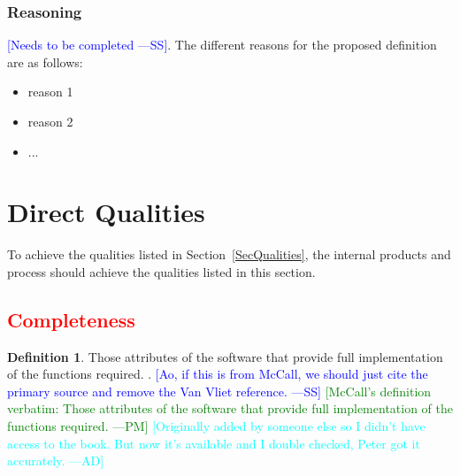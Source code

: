 \documentclass[letterpaper, cleveref]{lipics-v2019}
\newcommand{\authornote}[3]{\textcolor{#1}{[#3 ---#2]}}
\newcommand{\authornote}[3]{}
\newcommand{\wss}[1]{\authornote{blue}{SS}{#1}} %
\newcommand{\pmi}[1]{\authornote{green}{PM}{#1}} %
\newcommand{\ad}[1]{\authornote{cyan}{AD}{#1}} %
\newcommand{\notdone}[1]{\textcolor{red}{#1}}
\theoremstyle{definition}
\newtheorem{defn}{Definition}
\begin{document}
\subsubsection*{Reasoning}

\wss{Needs to be completed}.   The different reasons for the proposed definition
are as follows:

\begin{itemize}
  \item reason 1
  \item reason 2
  \item ...
\end{itemize}


\section{Direct Qualities} \label{SecDirectQs}

To achieve the  qualities listed in Section~\ref{SecQualities}, the internal
products and process should achieve the qualities listed in this section.


\subsection{\notdone{Completeness}} %

\begin{defn}
  Those attributes of the software that provide full implementation of the
  functions required. \citep{McCallEtAl1977}. \wss{Ao, if this is from McCall,
  we should just cite the primary source and remove the Van Vliet reference.}
  \pmi{McCall's definition verbatim: Those attributes of the software that
  provide full implementation of the functions required.} \ad{Originally added
  by someone else so I didn't have access to the book. But now it's available
  and I double checked, Peter got it accurately.}
\end{defn}
\end{document}
